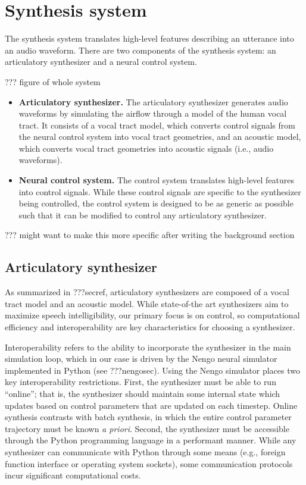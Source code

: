 \section{Synthesis system}

The synthesis system translates
high-level features describing an utterance
into an audio waveform.
There are two components of the synthesis system:
an articulatory synthesizer and a neural control system.

??? figure of whole system

\begin{itemize}
\item \textbf{Articulatory synthesizer.} The articulatory synthesizer
  generates audio waveforms
  by simulating the airflow through a model of the human vocal tract.
  It consists of a vocal tract model,
  which converts control signals from the neural control system
  into vocal tract geometries,
  and an acoustic model,
  which converts vocal tract geometries into acoustic signals
  (i.e., audio waveforms).
\item \textbf{Neural control system.} The control system
  translates high-level features into control signals.
  While these control signals are specific to the
  synthesizer being controlled,
  the control system is designed to be as generic
  as possible such that it can be modified to control
  any articulatory synthesizer.
\end{itemize}

??? might want to make this more specific after writing
the background section

\subsection{Articulatory synthesizer}

As summarized in ???secref,
articulatory synthesizers are composed
of a vocal tract model and an acoustic model.
While state-of-the art synthesizers aim to
maximize speech intelligibility,
our primary focus is on control,
so computational efficiency
and interoperability are
key characteristics for choosing a synthesizer.

Interoperability refers to the ability
to incorporate the synthesizer
in the main simulation loop,
which in our case is driven by
the Nengo neural simulator
implemented in Python
(see ???nengosec).
Using the Nengo simulator places
two key interoperability restrictions.
First, the synthesizer must
be able to run ``online'';
that is, the synthesizer should maintain
some internal state which updates
based on control parameters
that are updated on each timestep.
Online synthesis contrasts with
batch synthesis, in which
the entire control parameter trajectory
must be known \textit{a priori}.
Second, the synthesizer must
be accessible through the Python
programming language in a performant manner.
While any synthesizer can communicate
with Python through some means
(e.g., foreign function interface
or operating system sockets),
some communication protocols incur
significant computational costs.

